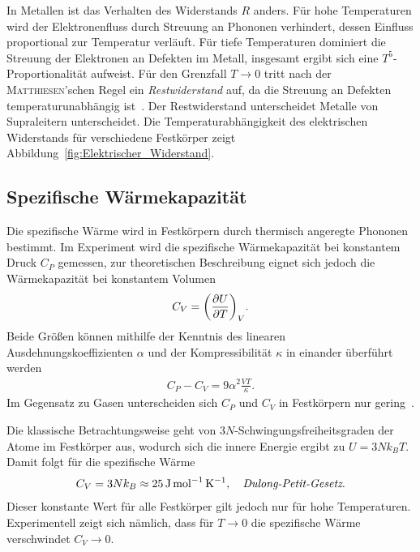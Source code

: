 \documentclass[parskip=half, a4paper,twoside,final]{article}
\begin{document}
In Metallen ist das Verhalten des Widerstands $R$ anders. Für hohe Temperaturen wird der Elektronenfluss durch Streuung an Phononen verhindert, dessen Einfluss proportional zur Temperatur verläuft. Für tiefe Temperaturen dominiert die Streuung der Elektronen an Defekten im Metall, insgesamt ergibt sich eine $T^5$-Proportionalität aufweist. Für den Grenzfall $T \to 0$ tritt nach der \textsc{Matthiesen}'schen Regel ein \emph{Restwiderstand} auf, da die Streuung an Defekten temperaturunabhängig ist~\cite{Hunklinger}. Der Restwiderstand unterscheidet Metalle von Supraleitern unterscheidet. Die Temperaturabhängigkeit des elektrischen Widerstands für verschiedene Festkörper zeigt Abbildung~\ref{fig:Elektrischer_Widerstand}.


\FloatBarrier

\subsection{Spezifische Wärmekapazität}
Die spezifische Wärme wird in Festkörpern durch thermisch angeregte Phononen bestimmt. Im Experiment wird die spezifische Wärmekapazität bei konstantem Druck $C_P$ gemessen, zur theoretischen Beschreibung eignet sich jedoch die Wärmekapazität bei konstantem Volumen
\begin{align}
  C_V = \qty(\pdv{U}{T})_V.
\end{align}
Beide Größen können mithilfe der Kenntnis des linearen Ausdehnungskoeffizienten $\alpha$ und der Kompressibilität $\kappa$ in einander überführt werden
\begin{align}
  C_P - C_V = 9 \alpha^2 \frac{V T}{\kappa}.
\end{align}
Im Gegensatz zu Gasen unterscheiden sich $C_P$ und $C_V$ in Festkörpern nur gering~\cite{Hunklinger}.

Die klassische Betrachtungsweise geht von $3N$-Schwingungsfreiheitsgraden der Atome im Festkörper aus, wodurch sich die innere Energie ergibt zu $U = 3 N k_B T$. Damit folgt für die spezifische Wärme
\begin{align}
  C_V = 3 N k_B \approx  \SI{25}{\joule\per\mole\per\kelvin}, \quad \emph{Dulong-Petit-Gesetz}.
\end{align}
Dieser konstante Wert für alle Festkörper gilt jedoch nur für hohe Temperaturen. Experimentell zeigt sich nämlich, dass für $T \to 0$ die spezifische Wärme verschwindet $C_V \to 0$.
\end{document}
